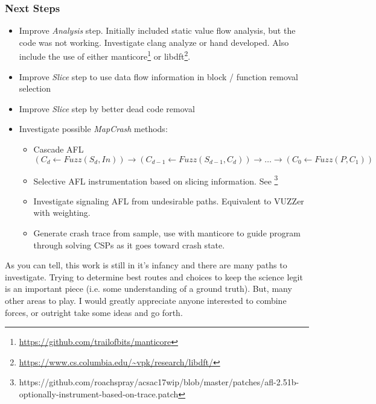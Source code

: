 \documentclass{beamer}
\begin{document}
\frame
{
	\frametitle{Next Steps}
	\tiny
	\begin{itemize}
	\item Improve \emph{Analysis} step. Initially included static value flow analysis, but the code was not working. Investigate clang analyze or hand developed. Also include the use of either manticore\footnote{\url{https://github.com/trailofbits/manticore}} or libdft\footnote{\url{https://www.cs.columbia.edu/~vpk/research/libdft/}}.


	\item Improve \emph{Slice} step to use data flow information in block / function removal selection
	\item Improve \emph{Slice} step by better dead code removal

	\item Investigate  possible \emph{MapCrash} methods:
	\begin{itemize}
	\tiny
	\item Cascade AFL 
\[
(C_d \leftarrow Fuzz(S_d, In)) \rightarrow (C_{d-1} \leftarrow Fuzz(S_{d-1}, C_d)) \rightarrow \ldots \rightarrow (C_0 \leftarrow Fuzz(P, C_1))
\]
	
	\item Selective AFL instrumentation based on slicing information. See \footnote{https://github.com/roachspray/acsac17wip/blob/master/patches/afl-2.51b-optionally-instrument-based-on-trace.patch}
	\item Investigate signaling AFL from undesirable paths. Equivalent to VUZZer with  weighting.
	\item Generate crash trace from sample, use with manticore to guide program through solving CSPs as it goes toward crash state.
	\end{itemize}
	\end{itemize}
	As you can tell, this work is still in it's infancy and there are many paths to investigate. Trying to determine best routes and
	choices to keep the science legit is an important piece (i.e. some understanding of a ground truth). But, many other areas to play.
	I would greatly appreciate anyone interested to combine forces, or outright take some ideas and go forth.
	
}
\end{document}
